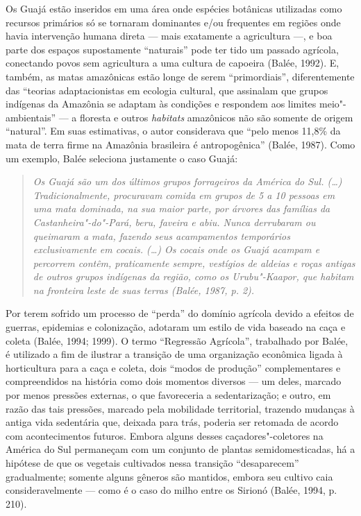 Os Guajá estão inseridos em uma área onde espécies botânicas utilizadas
como recursos primários só se tornaram dominantes e/ou frequentes em
regiões onde havia intervenção humana direta --- mais exatamente a
agricultura ---, e boa parte dos espaços supostamente ``naturais'' pode
ter tido um passado agrícola, conectando povos sem agricultura a uma
cultura de capoeira (Balée, 1992). E, também, as matas amazônicas estão
longe de serem ``primordiais'', diferentemente das ``teorias
adaptacionistas em ecologia cultural, que assinalam que grupos indígenas
da Amazônia se adaptam às condições e respondem aos limites
meio"-ambientais'' --- a floresta e outros \emph{habitats} amazônicos não
são somente de origem ``natural''. Em suas estimativas, o autor
considerava que ``pelo menos 11,8\% da mata de terra firme na Amazônia
brasileira é antropogênica'' (Balée, 1987). Como um exemplo, Balée
seleciona justamente o caso Guajá:

\begin{quote}
\emph{Os Guajá são um dos últimos grupos forrageiros da América do Sul.
(\ldots{}) Tradicionalmente, procuravam comida em grupos de 5 a 10
pessoas em uma mata dominada, na sua maior parte, por árvores das
famílias da Castanheira"-do"-Pará, beru, faveira e abiu. Nunca derrubaram
ou queimaram a mata, fazendo seus acampamentos temporários
exclusivamente em cocais. (\ldots{}) Os cocais onde os Guajá acampam e
percorrem contêm, praticamente sempre, vestígios de aldeias e roças
antigas de outros grupos indígenas da região, como os Urubu"-Kaapor, que
habitam na fronteira leste de suas terras (Balée, 1987, p. 2).}
\end{quote}

Por terem sofrido um processo de ``perda'' do domínio agrícola devido a
efeitos de guerras, epidemias e colonização, adotaram um estilo de vida
baseado na caça e coleta (Balée, 1994; 1999). O termo ``Regressão
Agrícola'', trabalhado por Balée, é utilizado a fim de ilustrar a
transição de uma organização econômica ligada à horticultura para a caça
e coleta, dois ``modos de produção'' complementares e compreendidos na
história como dois momentos diversos --- um deles, marcado por menos
pressões externas, o que favoreceria a sedentarização; e outro, em razão
das tais pressões, marcado pela mobilidade territorial, trazendo
mudanças à antiga vida sedentária que, deixada para trás, poderia ser
retomada de acordo com acontecimentos futuros. Embora alguns desses
caçadores"-coletores na América do Sul permaneçam com um conjunto de
plantas semidomesticadas, há a hipótese de que os vegetais cultivados
nessa transição ``desaparecem'' gradualmente; somente alguns gêneros são
mantidos, embora seu cultivo caia consideravelmente --- como é o caso do
milho entre os Sirionó (Balée, 1994, p. 210).

